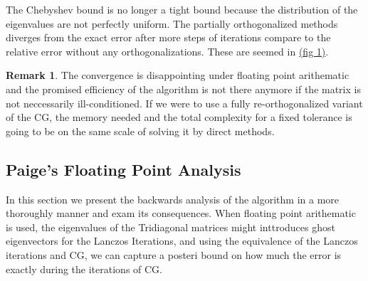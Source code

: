 \documentclass[]{article}
\theoremstyle{definition}
\newtheorem{remark}{Remark}[subsection]
\begin{document}
        The Chebyshev bound is no longer a tight bound because the distribution of the eigenvalues are not perfectly uniform. The partially orthogonalized methods diverges from the exact error after more steps of iterations compare to the relative error without any orthogonalizations. These are seemed in \hyperref[fig:1]{(fig 1)}. 
        \begin{remark}
            The convergence is disappointing under floating point arithematic and the promised efficiency of the algorithm is not there anymore if the matrix is not neccessarily ill-conditioned. If we were to use a fully re-orthogonalized variant of the CG, the memory needed and the total complexity for a fixed tolerance is going to be on the same scale of solving it by direct methods. 
        \end{remark}
    \subsection{Paige's Floating Point Analysis}
        In this section we present the backwards analysis of the algorithm in a more thoroughly manner and exam its consequences. When floating point arithematic is used, the eigenvalues of the Tridiagonal matrices might inttroduces ghost eigenvectors for the Lanczos Iterations, and using the equivalence of the Lanczos iterations and CG, we can capture a posteri bound on how much the error is exactly during the iterations of CG. 
\end{document}
